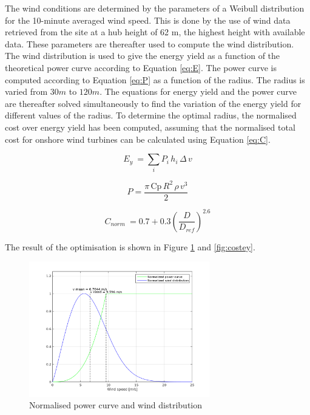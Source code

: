 The wind conditions are determined by the parameters of a Weibull distribution for the 10-minute averaged wind speed. This is done by the use of wind data retrieved from the site at a hub height of 62 m, the highest height with available data. These parameters are thereafter used to compute the wind distribution. The wind distribution is used to give the energy yield as a function of the theoretical power curve according to Equation \ref{eq:E}. The power curve is computed according to Equation \ref{eq:P} as a function of the radius. The radius is varied from $30 m$ to $120 m$. The equations for energy yield and the power curve are thereafter solved simultaneously to find the variation of the energy yield for different values of the radius. To determine the optimal radius, the normalised cost over energy yield has been computed, assuming that the normalised total cost for onshore wind turbines can be calculated using Equation \ref{eq:C}.


\begin{equation}
E_{y}\ = \sum_{i} P_{i}\, h_{i}\, \Delta \, v
\label{eq:E}
\end{equation}

\begin{equation}
P = \frac{\pi\, \mathrm{Cp}\, R^2\, \rho\, v^3}{2}
\label{eq:P}
\end{equation}

\begin{equation}
C_{norm}\ = 0.7 + 0.3 {\left(\frac{D}{D_{ref}}\right)}^{2.6}
\label{eq:C}
\end{equation}


\vspace{3mm}

The result of the optimisation is shown in Figure \ref{fig:pcurve} and \ref{fig:costey}.

\begin{figure}[H]
\centering
\includegraphics[width=0.7\textwidth]{Images/power_curve.png} 
\caption{Normalised power curve and wind distribution}\label{fig:pcurve}
\end{figure}

